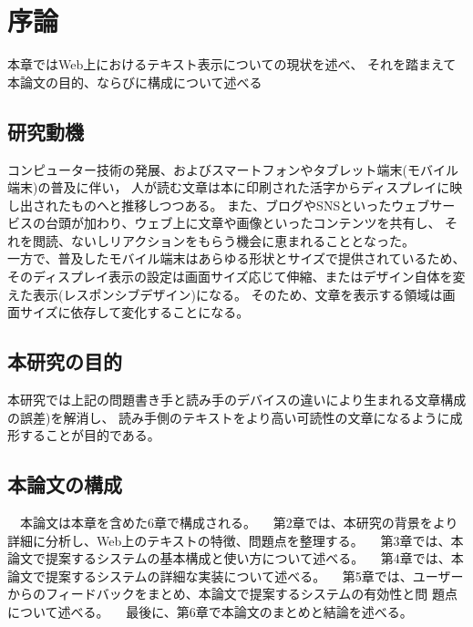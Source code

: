\chapter{序論}
\label{chap:introduction}

本章ではWeb上におけるテキスト表示についての現状を述べ、
それを踏まえて本論⽂の目的、ならびに構成について述べる

\section{研究動機}

コンピューター技術の発展、およびスマートフォンやタブレット端末(モバイル端末)の普及に伴い，
人が読む文章は本に印刷された活字からディスプレイに映し出されたものへと推移しつつある。
また、ブログやSNSといったウェブサービスの台頭が加わり、ウェブ上に文章や画像といったコンテンツを共有し、
それを閲読、ないしリアクションをもらう機会に恵まれることとなった。
\\一方で、普及したモバイル端末はあらゆる形状とサイズで提供されているため、
そのディスプレイ表示の設定は画面サイズ応じて伸縮、またはデザイン自体を変えた表示(レスポンシブデザイン)になる。
そのため、文章を表示する領域は画面サイズに依存して変化することになる。

\section{本研究の目的}

本研究では上記の問題書き手と読み手のデバイスの違いにより生まれる文章構成の誤差)を解消し、
読み手側のテキストをより高い可読性の文章になるように成形することが目的である。

\section{本論文の構成}


 本論⽂は本章を含めた6章で構成される。
 第2章では、本研究の背景をより詳細に分析し、Web上のテキストの特徴、問題点を整理する。
 第3章では、本論⽂で提案するシステムの基本構成と使い⽅について述べる。
 第4章では、本論⽂で提案するシステムの詳細な実装について述べる。
 第5章では、ユーザーからのフィードバックをまとめ、本論⽂で提案するシステムの有効性と問
題点について述べる。
 最後に、第6章で本論⽂のまとめと結論を述べる。